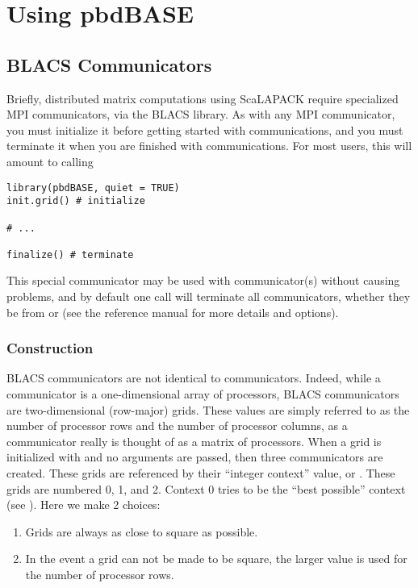 \section{Using pbdBASE}


\subsection{BLACS Communicators}


Briefly, distributed matrix computations using ScaLAPACK require specialized MPI communicators, via the BLACS library.  As with any MPI communicator, you must initialize it before getting started with communications, and you must terminate it when you are finished with communications.  For most users, this will amount to calling

\begin{lstlisting}[language=rr]
library(pbdBASE, quiet = TRUE)
init.grid() # initialize

# ...

finalize() # terminate
\end{lstlisting}

This special communicator may be used with  communicator(s) without causing problems, and by default one  call will terminate all communicators, whether they be from  or  (see the  reference manual for more details and options).  

\subsubsection{Construction}

BLACS communicators are not identical to  communicators.  Indeed, while a  communicator is a one-dimensional array of processors, BLACS communicators are two-dimensional (row-major) grids.  These values are simply referred to as the number of processor rows and the number of processor columns, as a communicator really is thought of as a matrix of processors.  When a grid is initialized with  and no arguments are passed, then three communicators are created.  These grids are referenced by their ``integer context'' value, or .  These grids are numbered 0, 1, and 2.  Context 0 tries to be the ``best possible'' context (see \citep{slug}).  Here we make 2 choices:
\begin{enumerate}
  \item Grids are always as close to square as possible.  
  \item In the event a grid can not be made to be square, the larger value is used for the number of processor rows.
\end{enumerate}

